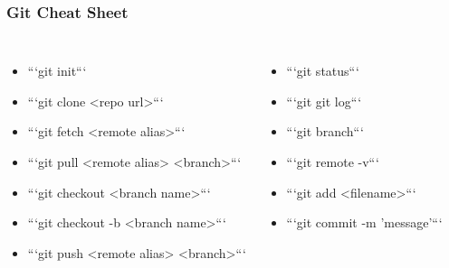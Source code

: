 \documentclass[unknownkeysallowed]{beamer}
\begin{document}
\begin{frame}
\frametitle{Git Cheat Sheet}
\begin{columns}
    \column{2.75in}
        \begin{itemize}
            \item{```git init```}
            \item{```git clone <repo url>```}
            \item{```git fetch <remote alias>```}
            \item{```git pull <remote alias> <branch>```}
            \item{```git checkout <branch name>```}
            \item{```git checkout -b <branch name>```}
            \item{```git push <remote alias> <branch>```}

        \end{itemize}
    \column{2.0in}
        \begin{itemize}
            \item{```git status```}
            \item{```git git log```}
            \item{```git branch```}
            \item{```git remote -v```}
            \item{```git add <filename>```}
            \item{```git commit -m 'message'```}
        \end{itemize}
    \end{columns}
\end{frame}
\end{document}

